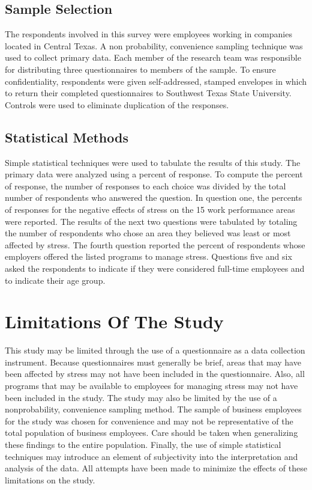 \documentclass[]{article}
\begin{document}
\subsection{Sample Selection}
The respondents involved in this survey were employees working in companies
located in Central Texas. A non probability, convenience sampling technique was used
to collect primary data. Each member of the research team was responsible for
distributing three questionnaires to members of the sample. To ensure confidentiality,
respondents were given self-addressed, stamped envelopes in which to return their
completed questionnaires to Southwest Texas State University. Controls were used to
eliminate duplication of the responses.

\subsection{Statistical Methods}
Simple statistical techniques were used to tabulate the results of this study. The
primary data were analyzed using a percent of response. To compute the percent of
response, the number of responses to each choice was divided by the total number of
respondents who answered the question. In question one, the percents of responses for
the negative effects of stress on the 15 work performance areas were reported. The
results of the next two questions were tabulated by totaling the number of respondents
who chose an area they believed was least or most affected by stress. The fourth
question reported the percent of respondents whose employers offered the listed
programs to manage stress. Questions five and six asked the respondents to indicate if
they were considered full-time employees and to indicate their age group.

\section{Limitations Of The Study}
This study may be limited through the use of a questionnaire as a data collection
instrument. Because questionnaires must generally be brief, areas that may have been
affected by stress may not have been included in the questionnaire.
Also, all programs that may be available to employees for managing stress may
not have been included in the study. The study may also be limited by the use of a
nonprobability, convenience sampling method. The sample of business employees for
the study was chosen for convenience and may not be representative of the total
population of business employees. Care should be taken when generalizing these
findings to the entire population. Finally, the use of simple statistical techniques may
introduce an element of subjectivity into the interpretation and analysis of the data. All
attempts have been made to minimize the effects of these limitations on the study.
\end{document}
